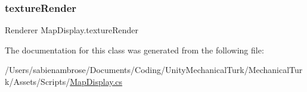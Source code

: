 \mbox{\label{class_map_display_acb52594fb49690c89c4929a3bbb34b61}} 
\subsubsection{\texorpdfstring{texture\+Render}{textureRender}}
{\footnotesize\ttfamily Renderer Map\+Display.\+texture\+Render}



The documentation for this class was generated from the following file\+:\begin{DoxyCompactItemize}
\item 
/\+Users/sabienambrose/\+Documents/\+Coding/\+Unity\+Mechanical\+Turk/\+Mechanical\+Turk/\+Assets/\+Scripts/\mbox{\hyperlink{_map_display_8cs}{Map\+Display.\+cs}}\end{DoxyCompactItemize}
